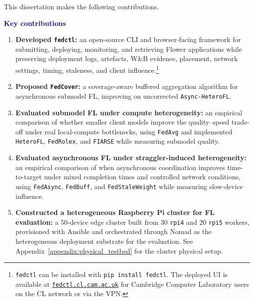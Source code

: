This dissertation makes the following contributions.

\begin{aimbox}
\textbf{\textcolor{darkblue}{Key contributions}}
\begin{enumerate}[label=(\alph*), topsep=6pt, itemsep=6pt]
  \item \textbf{Developed \texttt{fedctl}:} an open-source CLI and browser-facing framework for submitting, deploying, monitoring, and retrieving Flower applications while preserving deployment logs, artefacts, W\&B evidence, placement, network settings, timing, staleness, and client influence.\footnote{\texttt{fedctl} can be installed with \texttt{pip install fedctl}. The deployed UI is available at \href{http://fedctl.cl.cam.ac.uk}{\texttt{fedctl.cl.cam.ac.uk}} for Cambridge Computer Laboratory users on the CL network or via the VPN.}
  \item \textbf{Proposed \texttt{FedCover}:} a coverage-aware buffered aggregation algorithm for asynchronous submodel FL, improving on uncorrected \texttt{Async-HeteroFL}.
  \item \textbf{Evaluated submodel FL under compute heterogeneity:} an empirical comparison of whether smaller client models improve the quality--speed trade-off under real local-compute bottlenecks, using \texttt{FedAvg} and implemented \texttt{HeteroFL}, \texttt{FedRolex}, and \texttt{FIARSE} while measuring submodel quality.
  \item \textbf{Evaluated asynchronous FL under straggler-induced heterogeneity:} an empirical comparison of when asynchronous coordination improves time-to-target under mixed completion times and controlled network conditions, using \texttt{FedAsync}, \texttt{FedBuff}, and \texttt{FedStaleWeight} while measuring slow-device influence.
  \item \textbf{Constructed a heterogeneous Raspberry Pi cluster for FL evaluation:} a 50-device edge cluster built from \(30\) \texttt{rpi4} and \(20\) \texttt{rpi5} workers, provisioned with Ansible and orchestrated through Nomad as the heterogeneous deployment substrate for the evaluation. See Appendix~\ref{appendix:physical_testbed} for the cluster physical setup.
\end{enumerate}
\end{aimbox}

